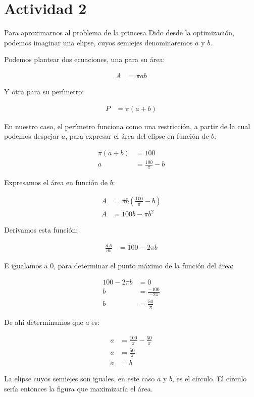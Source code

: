 \section*{Actividad 2}

Para aproximarnos al problema de la princesa Dido desde la optimización, 
podemos imaginar una elipse, cuyos semiejes denominaremos $a$ y $b$.

\begin{center}
\end{center}

Podemos plantear dos ecuaciones, una para su área:

\begin{align*}
    A &= \pi ab
\end{align*}

Y otra para su perímetro:

\begin{align*}
    P &= \pi (a + b)
\end{align*}

En nuestro caso, el perímetro funciona como una restricción, a partir de la cual podemos despejar $a$, para expresar el área del elipse en función de $b$:

\begin{align*}
    \pi (a + b) &= 100\\
    a &= \frac{100}{\pi} - b
\end{align*}

Expresamos el área en función de $b$:

\begin{align*}
    A &= \pi b (\frac{100}{\pi} - b)\\
    A &= 100b - \pi b^2
\end{align*}

Derivamos esta función:

\begin{align*}
    \frac{dA}{db} &= 100 - 2 \pi b
\end{align*}

E igualamos a 0, para determinar el punto máximo de la función del área:

\begin{align*}
    100 - 2 \pi b &= 0\\
    b &= \frac{-100}{-2 \pi}\\
    b &= \frac{50}{\pi}
\end{align*}

De ahí determinamos que $a$ es: 

\begin{align*}
    a &= \frac{100}{\pi} - \frac{50}{\pi}\\
    a &= \frac{50}{\pi}\\
    a &= b
\end{align*}

La elipse cuyos semiejes son iguales, en este caso $a$ y $b$, es el círculo. El círculo sería entonces la figura que maximizaría el área.
